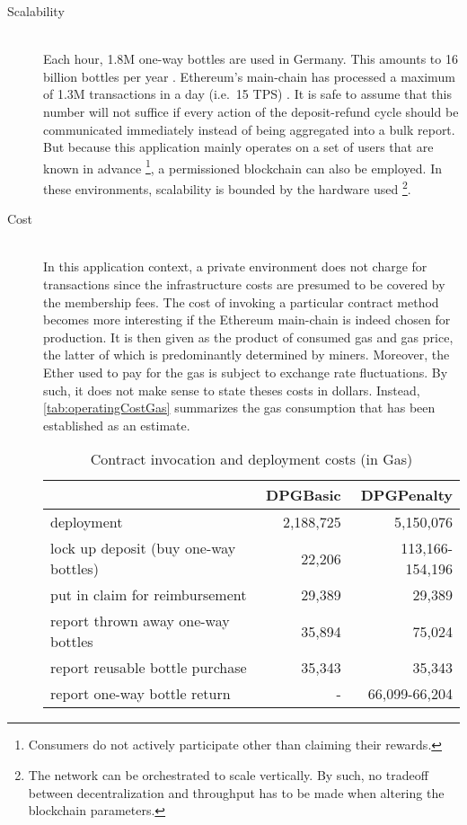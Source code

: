 \begin{description}
	\item[Scalability]
	\hfill \\
	Each hour, 1.8M one-way bottles are used in Germany. This amounts to 16 billion bottles per year \cite{DUHEinweg}. Ethereum's main-chain has processed a maximum of 1.3M transactions in a day (i.e.~15 TPS) \cite{etherscan}. It is safe to assume that this number will not suffice if every action of the deposit-refund cycle should be communicated immediately instead of being aggregated into a bulk report. But because this application mainly operates on a set of users that are known in advance \footnote{Consumers do not actively participate other than claiming their rewards.}, a permissioned blockchain can also be employed. In these environments, scalability is bounded by the hardware used \footnote{The network can be orchestrated to scale vertically. By such, no tradeoff between decentralization and throughput has to be made when altering the blockchain parameters.}. 
	
	\item[Cost]
	\hfill \\
	In this application context, a private environment does not charge for transactions since the infrastructure costs are presumed to be covered by the membership fees. The cost of invoking a particular contract method becomes more interesting if the Ethereum main-chain is indeed chosen for production. It is then given as the product of consumed gas and gas price, the latter of which is predominantly determined by miners. Moreover, the Ether used to pay for the gas is subject to exchange rate fluctuations. By such, it does not make sense to state theses costs in dollars. Instead, \autoref{tab:operatingCostGas} summarizes the gas consumption that has been established as an estimate.

	\begin{table}[hbt]
	\centering	
	\begin{tabular}{l|r|r}
    	& DPGBasic & DPGPenalty \\
    	\hline
    	deployment & 2,188,725 & 5,150,076 \\
    	\hline
    	lock up deposit (buy one-way bottles) & 22,206 & 113,166-154,196 \\ 
    	put in claim for reimbursement & 29,389 & 29,389 \\
    	report thrown away one-way bottles & 35,894 & 75,024 \\
    	report reusable bottle purchase & 35,343 & 35,343 \\
    	\hline
    	report one-way bottle return & - & 66,099-66,204 \\
	\end{tabular}
	\caption[Contract invocation and deployment costs (in Gas)]{Contract invocation and deployment costs (in Gas) \footnotemark}
	\label{tab:operatingCostGas}
	\end{table}
	
	\FloatBarrier

\end{description}
  
